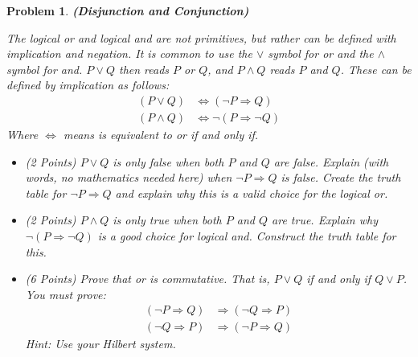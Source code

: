 \documentclass{article}
\theoremstyle{normal}
\newtheorem{problem}{Problem}
\begin{document}
    \begin{problem}
        \textbf{(Disjunction and Conjunction)}
        \par\hfill\par
        The \textit{logical or} and \textit{logical and} are not primitives,
        but rather can be defined with implication and negation.
        It is common to use the
        $\lor$ symbol for \textit{or} and the $\land$ symbol for \textit{and}.
        $P\lor{Q}$ then reads $P$ \textit{or} $Q$, and $P\land{Q}$ reads
        $P$ \textit{and} $Q$. These can be defined by implication as follows:
        \begin{align}
            (P\lor{Q})&\Leftrightarrow(\neg{P}\Rightarrow{Q})\\
            (P\land{Q})&\Leftrightarrow\neg(P\Rightarrow\neg{Q})
        \end{align}
        Where $\Leftrightarrow$ means \textit{is equivalent to} or
        \textit{if and only if}.
        \begin{itemize}
            \item (2 Points) $P\lor{Q}$ is only false when both $P$ and $Q$ are
                false. Explain (with words, no mathematics needed here) when
                $\neg{P}\Rightarrow{Q}$ is false. Create the truth table for
                $\neg{P}\Rightarrow{Q}$ and explain why this is a valid choice
                for the logical or.
            \item (2 Points) $P\land{Q}$ is only true when both $P$ and $Q$ are
                true. Explain why $\neg(P\Rightarrow\neg{Q})$ is a good choice
                for logical and. Construct the truth table for this.
            \item (6 Points) Prove that \textit{or} is commutative. That is,
                $P\lor{Q}$ if and only if $Q\lor{P}$. You must prove:
                \begin{align}
                    (\neg{P}\Rightarrow{Q})&\Rightarrow(\neg{Q}\Rightarrow{P})\\
                    (\neg{Q}\Rightarrow{P})&\Rightarrow(\neg{P}\Rightarrow{Q})
                \end{align}
                Hint: Use your Hilbert system.
        \end{itemize}
    \end{problem}
\end{document}
